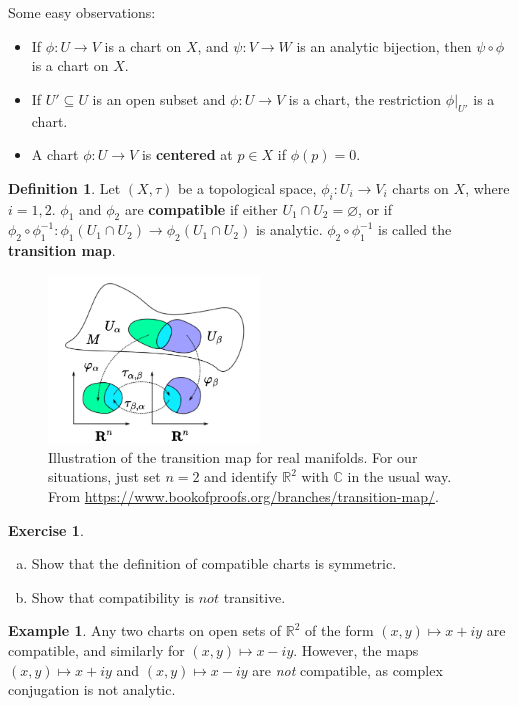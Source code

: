 \documentclass[12pt]{article}
\newcommand{\cx}{\mathbb{C}}
\newcommand{\real}{\mathbb{R}}
\newcommand{\ita}[1]{\textit{#1}}
\theoremstyle{definition}
\newtheorem{definition}[theorem]{Definition}
\newtheorem{example}[theorem]{Example}
\newtheorem{exercise}{Exercise}
\theoremstyle{remark}
\begin{document}
Some easy observations:
\begin{itemize}
    \item If $\phi:U\to V$ is a chart on $X$, and $\psi:V\to W$ is an analytic bijection, then $\psi\circ\phi$ is a chart on $X$.
    \item If $U'\subseteq U$ is an open subset and $\phi:U\to V$ is a chart, the restriction $\left.\phi\right|_{U'}$ is a chart.
    \item A chart $\phi:U\to V$ is \textbf{centered} at $p\in X$ if $\phi(p)=0$.
\end{itemize}
\begin{definition}
    Let $(X,\tau)$ be a topological space, $\phi_i:U_i\to V_i$ charts on $X$, where $i=1,2$. $\phi_1$ and $\phi_2$ are \textbf{compatible} if either $U_1\cap U_2=\varnothing$, or if $\phi_2\circ\phi_1^{-1}:\phi_1(U_1\cap U_2)\to\phi_2(U_1\cap U_2)$ is analytic. $\phi_2\circ\phi_1^{-1}$ is called the \textbf{transition map}.
    \begin{figure}[H]
        \centering
        \includegraphics[width=0.5\textwidth]{1.png}
        \caption{Illustration of the transition map for real manifolds. For our situations, just set $n=2$ and identify $\real^2$ with $\cx$ in the usual way. From \url{https://www.bookofproofs.org/branches/transition-map/}.}
        \label{fig:Fig1}
    \end{figure}
\end{definition}
\begin{exercise}
    \noindent
    \begin{enumerate}[(a)]
        \item Show that the definition of compatible charts is symmetric.
        \item Show that compatibility is $\ita{not}$ transitive.
    \end{enumerate}
\end{exercise}
\begin{example}
    Any two charts on open sets of $\real^2$ of the form $(x,y)\mapsto x+iy$ are compatible, and similarly for $(x,y)\mapsto x-iy$. However, the maps $(x,y)\mapsto x+iy$ and $(x,y)\mapsto x-iy$ are \ita{not} compatible, as complex conjugation is not analytic.
\end{example}
\end{document}
